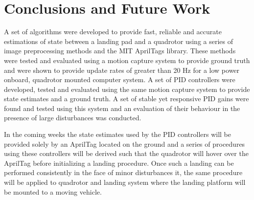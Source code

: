 \documentclass[11pt, twocolumn]{article}
\begin{document}
\section{Conclusions and Future Work}
A set of algorithms were developed to provide fast, reliable and accurate estimations of state between a landing pad and a quadrotor using a series of image preprocessing methods and the MIT AprilTags library. These methods were tested and evaluated using a motion capture system to provide ground truth and were shown to provide update rates of greater than 20 Hz for a low power onboard, quadrotor mounted computer system. A set of PID controllers were developed, tested and evaluated using the same motion capture system to provide state estimates and a ground truth. A set of stable yet responsive PID gains were found and tested using this system and an evaluation of their behaviour in the presence of large disturbances was conducted. 

In the coming weeks the state estimates used by the PID controllers will be provided solely by an AprilTag located on the ground and a series of procedures using these controllers will be derived such that the quadrotor will hover over the AprilTag before initializing a landing procedure. Once such a landing can be performed consistently in the face of minor disturbances it, the same procedure will be applied to quadrotor and landing system where the landing platform will be mounted to a moving vehicle.

{}

\end{document}

